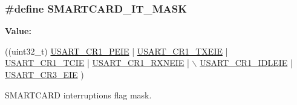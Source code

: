 \subsubsection[{\texorpdfstring{S\+M\+A\+R\+T\+C\+A\+R\+D\+\_\+\+I\+T\+\_\+\+M\+A\+SK}{SMARTCARD_IT_MASK}}]{\setlength{\rightskip}{0pt plus 5cm}\#define S\+M\+A\+R\+T\+C\+A\+R\+D\+\_\+\+I\+T\+\_\+\+M\+A\+SK}\hypertarget{group___s_m_a_r_t_c_a_r_d___private___constants_ga2d4be8e0259fd370f82c53579c96ede5}{}\label{group___s_m_a_r_t_c_a_r_d___private___constants_ga2d4be8e0259fd370f82c53579c96ede5}
{\bfseries Value\+:}
\begin{DoxyCode}
((uint32\_t) \hyperlink{group___peripheral___registers___bits___definition_ga27405d413b6d355ccdb076d52fef6875}{USART\_CR1\_PEIE} | \hyperlink{group___peripheral___registers___bits___definition_ga70422871d15f974b464365e7fe1877e9}{USART\_CR1\_TXEIE} | 
      \hyperlink{group___peripheral___registers___bits___definition_gaa17130690a1ca95b972429eb64d4254e}{USART\_CR1\_TCIE} | \hyperlink{group___peripheral___registers___bits___definition_ga91118f867adfdb2e805beea86666de04}{USART\_CR1\_RXNEIE} | \(\backslash\)
                                        \hyperlink{group___peripheral___registers___bits___definition_ga5221d09eebd12445a20f221bf98066f8}{USART\_CR1\_IDLEIE} | 
      \hyperlink{group___peripheral___registers___bits___definition_gaaed1a39c551b1641128f81893ff558d0}{USART\_CR3\_EIE} )
\end{DoxyCode}


S\+M\+A\+R\+T\+C\+A\+RD interruptions flag mask. 

